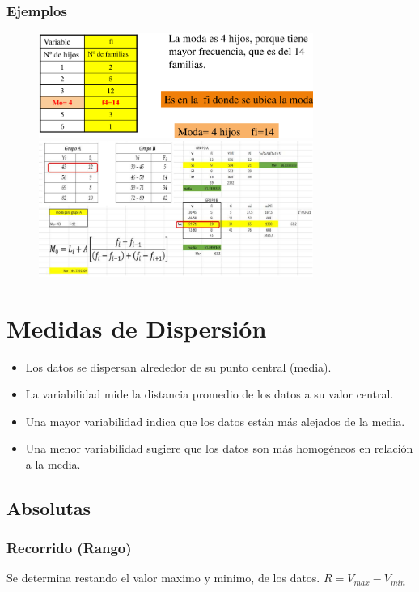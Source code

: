 \documentclass{article}
\begin{document}
        \subsubsection{Ejemplos}
            \begin{figure}[H]
                \centering
                \includegraphics[width=0.8\textwidth]{img/moda1.png}
                \includegraphics[width=0.8\textwidth]{img/moda2.png}
            \end{figure}

\section{Medidas de Dispersión}
    \begin{itemize}
        \item Los datos se dispersan alrededor de su punto central (media).
        \item La variabilidad mide la distancia promedio de los datos a su valor central.
        \item Una mayor variabilidad indica que los datos están más alejados de la media.
        \item Una menor variabilidad sugiere que los datos son más homogéneos en relación a la media.
    \end{itemize} 
    \subsection{Absolutas}
        \subsubsection{Recorrido (Rango)}
            Se determina restando el valor maximo y minimo, de los datos. $R = V_{max} - V_{min}$
\end{document}
